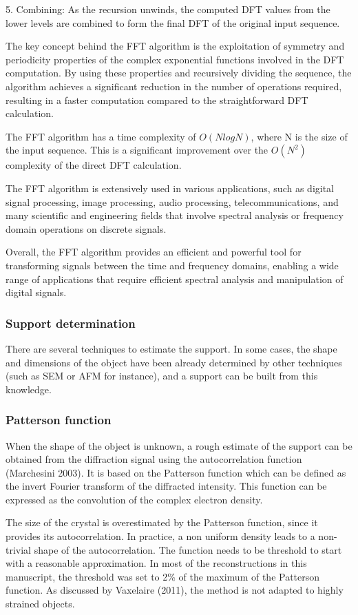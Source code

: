 5. Combining: As the recursion unwinds, the computed DFT values from the lower levels are combined to form the final DFT of the original input sequence.

The key concept behind the FFT algorithm is the exploitation of symmetry and periodicity properties of the complex exponential functions involved in the DFT computation. By using these properties and recursively dividing the sequence, the algorithm achieves a significant reduction in the number of operations required, resulting in a faster computation compared to the straightforward DFT calculation.

The FFT algorithm has a time complexity of $O(N log N)$, where N is the size of the input sequence. This is a significant improvement over the $O(N^2)$ complexity of the direct DFT calculation.

The FFT algorithm is extensively used in various applications, such as digital signal processing, image processing, audio processing, telecommunications, and many scientific and engineering fields that involve spectral analysis or frequency domain operations on discrete signals.

Overall, the FFT algorithm provides an efficient and powerful tool for transforming signals between the time and frequency domains, enabling a wide range of applications that require efficient spectral analysis and manipulation of digital signals.

\subsubsection{Support determination}
There are several techniques to estimate the support. In some cases, the shape and dimensions of the object have been already determined by other techniques (such as SEM or AFM for instance), and a support can be built from this knowledge.

\subsubsection{Patterson function}
When the shape of the object is unknown, a rough estimate of the support can be obtained from the diffraction signal using the autocorrelation function (Marchesini 2003). It is based on the Patterson function which can be defined as the invert Fourier transform of the diffracted intensity. This function can be expressed as the convolution of the complex electron density.

The size of the crystal is overestimated by the Patterson function, since it provides its autocorrelation. In practice, a non uniform density leads to a non-trivial shape of the autocorrelation. The function needs to be threshold to start with a reasonable approximation. In most of the reconstructions in this manuscript, the threshold was set to 2\% of the maximum of the Patterson function. As discussed by Vaxelaire (2011), the method is not adapted to highly strained objects.

